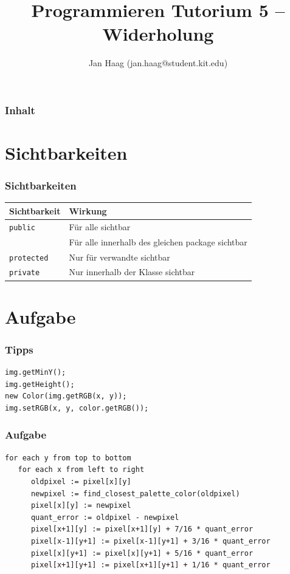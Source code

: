 \documentclass{beamer}
\author{Jan Haag (jan.haag@student.kit.edu)}
\title{Programmieren Tutorium 5 -- Widerholung}
\institute{Institut f\"ur Theoretische Informatik}
\begin{document}
\begin{frame}
\maketitle
\end{frame}

\begin{frame}
\frametitle{Inhalt}
\tableofcontents
\end{frame}

\section{Sichtbarkeiten}
\begin{frame}[fragile]
\frametitle{Sichtbarkeiten}
\begin{tabular}{l|l}
Sichtbarkeit & Wirkung\\
\hline
\verb|public| & F\"{u}r alle sichtbar\\
 & F\"{u}r alle innerhalb des gleichen package sichtbar\\
\verb|protected| & Nur f\"{u}r \glqq{}verwandte\grqq{} sichtbar\\
\verb|private| & Nur innerhalb der Klasse sichtbar\\
\end{tabular}
\end{frame}

\section{Aufgabe}
\begin{frame}[fragile]
\frametitle{Tipps}
\begin{verbatim}
img.getMinY();
img.getHeight();
new Color(img.getRGB(x, y));
img.setRGB(x, y, color.getRGB());
\end{verbatim}
\end{frame}

\begin{frame}[fragile]
\frametitle{Aufgabe}
\begin{verbatim}
for each y from top to bottom
   for each x from left to right
      oldpixel := pixel[x][y]
      newpixel := find_closest_palette_color(oldpixel)
      pixel[x][y] := newpixel
      quant_error := oldpixel - newpixel
      pixel[x+1][y] := pixel[x+1][y] + 7/16 * quant_error
      pixel[x-1][y+1] := pixel[x-1][y+1] + 3/16 * quant_error
      pixel[x][y+1] := pixel[x][y+1] + 5/16 * quant_error
      pixel[x+1][y+1] := pixel[x+1][y+1] + 1/16 * quant_error
\end{verbatim}
\end{frame}
\end{document}
